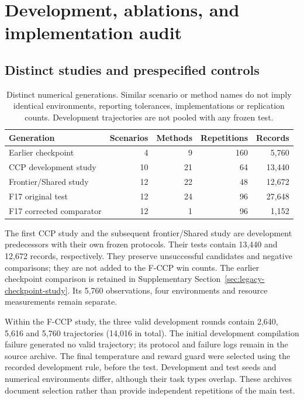 \documentclass[11pt]{article}
\theoremstyle{remark}
\begin{document}
\section{Development, ablations, and implementation audit}\label{sec:development-audit}
\subsection{Distinct studies and prespecified controls}
\begin{table}[t]
\centering
\caption{Distinct numerical generations. Similar scenario or method names do not imply identical environments, reporting tolerances, implementations or replication counts. Development trajectories are not pooled with any frozen test.}
\label{tab:data-generations}
\footnotesize
\begin{tabular}{lrrrr}
\toprule
Generation & Scenarios & Methods & Repetitions & Records \\
\midrule
Earlier checkpoint & 4 & 9 & 160 & 5,760 \\
CCP development study & 10 & 21 & 64 & 13,440 \\
Frontier/Shared study & 12 & 22 & 48 & 12,672 \\
F17 original test & 12 & 24 & 96 & 27,648 \\
F17 corrected comparator & 12 & 1 & 96 & 1,152 \\
\bottomrule
\end{tabular}
\end{table}

The first CCP study and the subsequent frontier/Shared study are development predecessors with their own frozen protocols. Their tests contain 13,440 and 12,672 records, respectively. They preserve unsuccessful candidates and negative comparisons; they are not added to the F-CCP win counts. The earlier checkpoint comparison is retained in Supplementary Section~\ref{sec:legacy-checkpoint-study}. Its 5,760 observations, four environments and resource measurements remain separate.

Within the F-CCP study, the three valid development rounds contain 2,640, 5,616 and 5,760 trajectories (14,016 in total). The initial development compilation failure generated no valid trajectory; its protocol and failure logs remain in the source archive. The final temperature and reward guard were selected using the recorded development rule, before the test. Development and test seeds and numerical environments differ, although their task types overlap. These archives document selection rather than provide independent repetitions of the main test.
\end{document}
